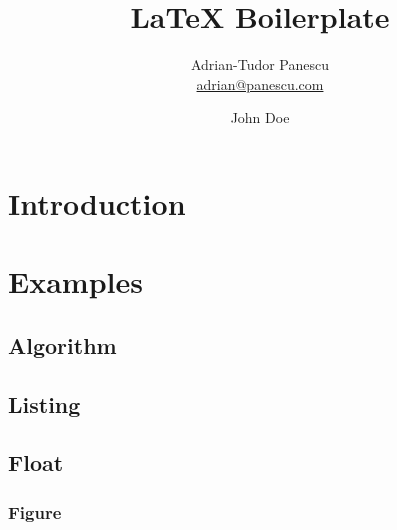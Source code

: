 \documentclass[12pt,a4paper,twoside]{report}
\author{
  Adrian-Tudor Panescu \\
  \href{mailto:adrian@panescu.com}{adrian@panescu.com}
  \and
  John Doe
}
\title{LaTeX Boilerplate}
\date{}  %
\begin{document}
    

    

    \setcounter{page}{3}

    \begin{abstract}
        
    \end{abstract}

    \tableofcontents

    \cleardoublepage

    \section{Introduction}
        \label{sec:intro}
        

    \cleardoublepage

    \section{Examples}
        \label{sec:ex}
        

        \FloatBarrier

        \subsection{Algorithm}
            \label{sec:algo}
            

        \clearpage

        \subsection{Listing}
            \label{sec:lst}
            

        \clearpage

        \subsection{Float}
            \label{sec:float}
            

            \FloatBarrier

            \subsubsection{Figure}
                \label{sec:fig}
                
\end{document}
